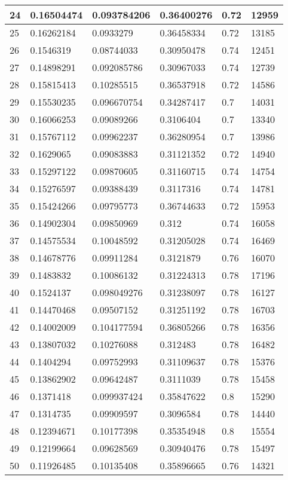 \begin{longtable}{|l|l|l|l|l|l|}
24 & 0.16504474 & 0.093784206 & 0.36400276 & 0.72 & 12959 \\ \hline 
25 & 0.16262184 & 0.0933279 & 0.36458334 & 0.72 & 13185 \\ \hline 
26 & 0.1546319 & 0.08744033 & 0.30950478 & 0.74 & 12451 \\ \hline 
27 & 0.14898291 & 0.092085786 & 0.30967033 & 0.74 & 12739 \\ \hline 
28 & 0.15815413 & 0.10285515 & 0.36537918 & 0.72 & 14586 \\ \hline 
29 & 0.15530235 & 0.096670754 & 0.34287417 & 0.7 & 14031 \\ \hline 
30 & 0.16066253 & 0.09089266 & 0.3106404 & 0.7 & 13340 \\ \hline 
31 & 0.15767112 & 0.09962237 & 0.36280954 & 0.7 & 13986 \\ \hline 
32 & 0.1629065 & 0.09083883 & 0.31121352 & 0.72 & 14940 \\ \hline 
33 & 0.15297122 & 0.09870605 & 0.31160715 & 0.74 & 14754 \\ \hline 
34 & 0.15276597 & 0.09388439 & 0.3117316 & 0.74 & 14781 \\ \hline 
35 & 0.15424266 & 0.09795773 & 0.36744633 & 0.72 & 15953 \\ \hline 
36 & 0.14902304 & 0.09850969 & 0.312 & 0.74 & 16058 \\ \hline 
37 & 0.14575534 & 0.10048592 & 0.31205028 & 0.74 & 16469 \\ \hline 
38 & 0.14678776 & 0.09911284 & 0.3121879 & 0.76 & 16070 \\ \hline 
39 & 0.1483832 & 0.10086132 & 0.31224313 & 0.78 & 17196 \\ \hline 
40 & 0.1524137 & 0.098049276 & 0.31238097 & 0.78 & 16127 \\ \hline 
41 & 0.14470468 & 0.09507152 & 0.31251192 & 0.78 & 16703 \\ \hline 
42 & 0.14002009 & 0.104177594 & 0.36805266 & 0.78 & 16356 \\ \hline 
43 & 0.13807032 & 0.10276088 & 0.312483 & 0.78 & 16482 \\ \hline 
44 & 0.1404294 & 0.09752993 & 0.31109637 & 0.78 & 15376 \\ \hline 
45 & 0.13862902 & 0.09642487 & 0.3111039 & 0.78 & 15458 \\ \hline 
46 & 0.1371418 & 0.099937424 & 0.35847622 & 0.8 & 15290 \\ \hline 
47 & 0.1314735 & 0.09909597 & 0.3096584 & 0.78 & 14440 \\ \hline 
48 & 0.12394671 & 0.10177398 & 0.35354948 & 0.8 & 15554 \\ \hline 
49 & 0.12199664 & 0.09628569 & 0.30940476 & 0.78 & 15497 \\ \hline 
50 & 0.11926485 & 0.10135408 & 0.35896665 & 0.76 & 14321 \\ \hline 
\end{longtable}